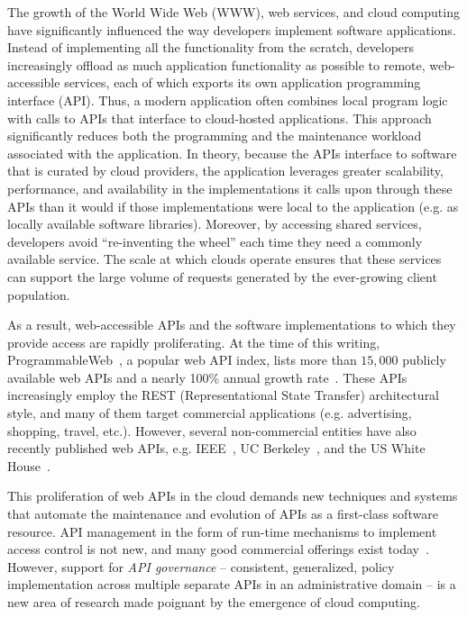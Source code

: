 The growth of the World Wide Web (WWW), web services, and cloud computing have
significantly influenced the way developers implement software applications.
Instead of implementing all the functionality from the scratch, developers
increasingly offload as much application functionality as possible to remote,
web-accessible services, each of which exports its own application programming
interface (API).  Thus, a modern application often combines local program logic
with calls to APIs that interface to cloud-hosted applications.
This approach significantly reduces both the programming and
the maintenance workload associated with the application. In theory, because
the APIs interface to software that is curated by cloud providers, the
application leverages greater scalability, performance, 
and availability in the implementations it calls upon through these APIs than
it would if those implementations were local to the application
(e.g. as locally available software libraries).
Moreover, by accessing shared services, developers avoid ``re-inventing the
wheel'' each time they need a commonly available service. The scale at
which clouds operate ensures that these services can support the large volume
of requests generated by the ever-growing client population.

As a result, web-accessible APIs and the software implementations to which
they provide access are rapidly proliferating. At the time of this writing, 
ProgrammableWeb~\cite{pweb}, a popular web API index, lists more than $15,000$
publicly available web APIs and a nearly 100\% annual growth rate~\cite{pweb_growth}.
These APIs increasingly employ the REST (Representational State Transfer) architectural style, and 
many of them target commercial applications (e.g.
advertising, shopping, travel, etc.).
However, several non-commercial entities have also recently published web 
APIs, e.g. IEEE~\cite{ieeeapis}, UC Berkeley~\cite{ucbapis}, and the US White
House~\cite{whitehouseapis}. 

This proliferation of web APIs in the cloud demands new techniques and systems that
automate the maintenance and evolution of APIs as a first-class software
resource.  API management in the form of run-time mechanisms to implement
access control is not
new, and many good commercial offerings exist today~\cite{3scale,apigee,layer7}.   
However, support for \textit{API governance} -- consistent, generalized, policy
implementation across multiple separate APIs in an administrative domain --
is a new area of research made poignant by the emergence of cloud computing.

